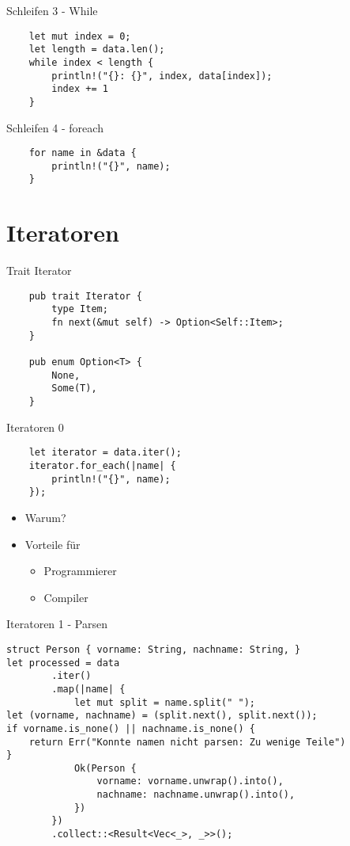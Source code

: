 \documentclass[aspectratio=1610,t]{beamer}
\begin{document}
\begin{frame}[fragile]{Schleifen 3 - While}
\begin{verbatim}
    let mut index = 0;
    let length = data.len();
    while index < length {
        println!("{}: {}", index, data[index]);
        index += 1
    }
\end{verbatim}
\end{frame}

\begin{frame}[fragile]{Schleifen 4 - foreach}
\begin{verbatim}
    for name in &data {
        println!("{}", name);
    }
\end{verbatim}
\end{frame}


{
\section{Iteratoren}
}

\begin{frame}[fragile]{Trait Iterator}
\begin{verbatim}
    pub trait Iterator {
        type Item;
        fn next(&mut self) -> Option<Self::Item>;
    }

    pub enum Option<T> {
        None,
        Some(T),
    }
\end{verbatim}
\end{frame}

\begin{frame}[fragile]{Iteratoren 0}
\begin{verbatim}
    let iterator = data.iter();
    iterator.for_each(|name| {
        println!("{}", name);
    });
\end{verbatim}

\begin{itemize}
 \item Warum?
 \item Vorteile für
    \begin{itemize}
     \item Programmierer
     \item Compiler
    \end{itemize}
\end{itemize}
\end{frame}



\begin{frame}[fragile]{Iteratoren 1 - Parsen}
\begin{verbatim}
struct Person { vorname: String, nachname: String, }
let processed = data
        .iter()
        .map(|name| {
            let mut split = name.split(" ");
let (vorname, nachname) = (split.next(), split.next());
if vorname.is_none() || nachname.is_none() {
    return Err("Konnte namen nicht parsen: Zu wenige Teile")
}
            Ok(Person {
                vorname: vorname.unwrap().into(),
                nachname: nachname.unwrap().into(),
            })
        })
        .collect::<Result<Vec<_>, _>>();
\end{verbatim}
\end{frame}
\end{document}
